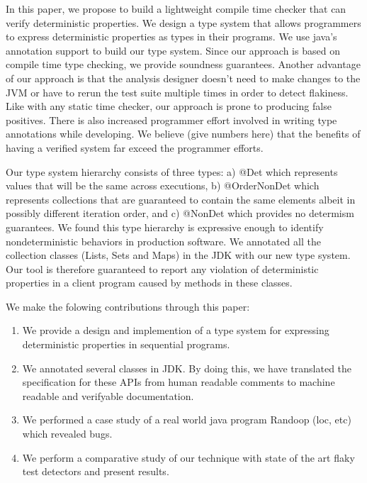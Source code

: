 In this paper, we propose to build a lightweight compile time checker that can verify deterministic properties. We design a
type system that allows programmers to express deterministic properties as types in their programs. We use
java's annotation support to build our type system. Since our approach is based on compile time type checking, we provide
soundness guarantees. Another advantage of our approach
is that the analysis designer doesn't need to make changes to the JVM or have to rerun the test suite multiple times in order
to detect flakiness. Like with any static time checker, our approach is prone to producing false positives. There is also increased programmer effort involved in writing type annotations while developing.
We believe (give numbers here) that the benefits of having a verified system far exceed the programmer efforts.

Our type system hierarchy consists of three types: a) @Det which represents values that will be the same across executions,
b) @OrderNonDet which represents collections that are guaranteed to contain the same elements albeit in possibly
different iteration order, and c) @NonDet which provides no determism guarantees.  We found this type hierarchy 
is expressive enough to identify nondeterministic behaviors in production software. We annotated all the collection
classes (Lists, Sets and Maps) in the JDK with our new type system. Our tool is therefore guaranteed to report any violation
of deterministic properties in a client program caused by methods in these classes. 

We make the folowing contributions through this paper:
\begin{enumerate}
	\item We provide a design and implemention of a type system for expressing deterministic properties in sequential programs.
	\item We annotated several classes in JDK. By doing this, we have translated the specification for these APIs from
	human readable comments to machine readable and verifyable documentation.
	\item We performed a case study of a real world java program Randoop (loc, etc) which revealed bugs.
	\item We perform a comparative study of our technique with state of the art flaky test detectors and present results.
\end{enumerate}